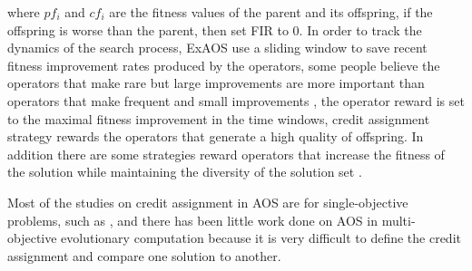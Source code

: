\documentclass[journal]{IEEEtran}
\begin{document}
where $pf_{i}$ and $cf_{i}$ are the fitness values of the parent and its offspring, if the offspring is worse than the parent, then set FIR to 0.
In order to track the dynamics of the search process, ExAOS \cite{fialho2008extreme} use a sliding window to save recent fitness improvement rates produced by the operators,
some people believe the operators that make rare but large improvements are more important than operators that make frequent and small improvements \cite{fialho2009dynamic},
the operator reward is set to the maximal fitness improvement in the time windows, credit assignment strategy rewards the operators that generate a high quality of offspring.
In addition there are some strategies reward operators that increase the fitness of the solution while maintaining the diversity of the solution set \cite{auer2002finite}.

Most of the studies on credit assignment in AOS are for single-objective problems, such as \cite{fialho2009dynamic,fialho2009dynamic,cowling2000hyperheuristic}, and there has been little work done on AOS in multi-objective evolutionary computation because it is very difficult to define the credit assignment and compare one solution to another.
\end{document}
